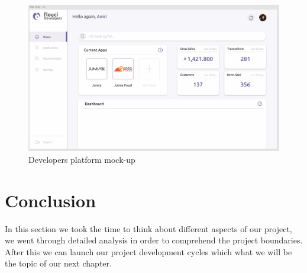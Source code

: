 \begin{spacing}{1.2}
\begin{figure}[H]\centering
\includegraphics[scale=0.4]{web_screen}
\caption{Developers platform mock-up}
\label{developersPlatform}
\end{figure}

\section*{Conclusion}
In this section we took the time to think about different aspects of our project, we went through detailed analysis in order to comprehend the project boundaries. After this we can launch our project development cycles which what we will be the topic of our next chapter.
\end{spacing}
